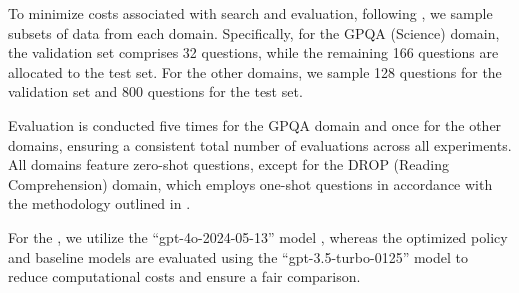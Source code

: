 \label{sec:expdetails}
To minimize costs associated with search and evaluation, following \citep{hu2024automated}, we sample subsets of data from each domain. Specifically, for the GPQA (Science) domain, the validation set comprises 32 questions, while the remaining 166 questions are allocated to the test set. For the other domains, we sample 128 questions for the validation set and 800 questions for the test set.

Evaluation is conducted five times for the GPQA domain and once for the other domains, ensuring a consistent total number of evaluations across all experiments. All domains feature zero-shot questions, except for the DROP (Reading Comprehension) domain, which employs one-shot questions in accordance with the methodology outlined in \citet{openai2023simpleevals}.

For the \framework, we utilize the “gpt-4o-2024-05-13” model \citep{openai2024gpt4technicalreport}, whereas the optimized policy and baseline models are evaluated using the “gpt-3.5-turbo-0125” model \citep{openai2022chatgpt} to reduce computational costs and ensure a fair comparison.
